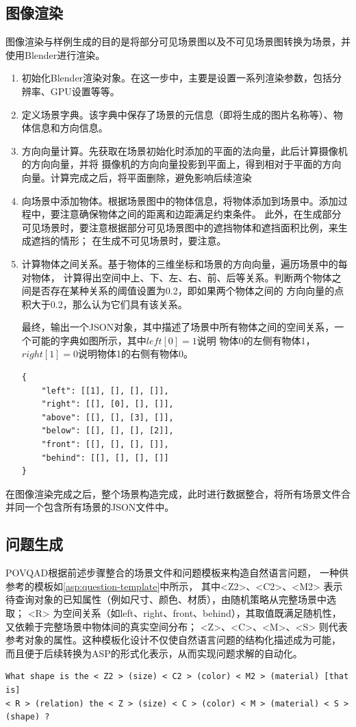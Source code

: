 \subsection{图像渲染}
图像渲染与样例生成的目的是将部分可见场景图以及不可见场景图转换为场景，并使用Blender进行渲染。

\begin{enumerate}[nosep]
\item 初始化Blender渲染对象。在这一步中，主要是设置一系列渲染参数，包括分辨率、GPU设置等等。
\item 定义场景字典。该字典中保存了场景的元信息（即将生成的图片名称等）、物体信息和方向信息。
\item 方向向量计算。先获取在场景初始化时添加的平面的法向量，此后计算摄像机的方向向量，并将
摄像机的方向向量投影到平面上，得到相对于平面的方向向量。计算完成之后，将平面删除，避免影响后续渲染
\item 向场景中添加物体。根据场景图中的物体信息，将物体添加到场景中。添加过程中，要注意确保物体之间的距离和边距满足约束条件。
此外，在生成部分可见场景时，要注意根据部分可见场景图中的遮挡物体和遮挡面积比例，来生成遮挡的情形；
在生成不可见场景时，要注意。
\item 计算物体之间关系。基于物体的三维坐标和场景的方向向量，遍历场景中的每对物体，
计算得出空间中上、下、左、右、前、后等关系。判断两个物体之间是否存在某种关系的阈值设置为0.2，即如果两个物体之间的
方向向量的点积大于0.2，那么认为它们具有该关系。

最终，输出一个JSON对象，其中描述了场景中所有物体之间的空间关系，一个可能的字典如图所示，其中$left[0] = 1$说明
物体0的左侧有物体1，$right[1] = 0$说明物体1的右侧有物体0。
\begin{lstlisting}
{
    "left": [[1], [], [], []],
    "right": [[], [0], [], []],
    "above": [[], [], [3], []],
    "below": [[], [], [], [2]],
    "front": [[], [], [], []],
    "behind": [[], [], [], []]
}
\end{lstlisting}
\end{enumerate}

在图像渲染完成之后，整个场景构造完成，此时进行数据整合，将所有场景文件合并同一个包含所有场景的JSON文件中。

\subsection{问题生成}
POVQAD根据前述步骤整合的场景文件和问题模板来构造自然语言问题，
一种供参考的模板如\ref{asp:question-template}中所示，
其中<Z2>、<C2>、<M2> 表示待查询对象的已知属性（例如尺寸、颜色、材质），由随机策略从完整场景中选取；
<R> 为空间关系（如left、right、front、behind），其取值既满足随机性，又依赖于完整场景中物体间的真实空间分布；
<Z>、<C>、<M>、<S> 则代表参考对象的属性。这种模板化设计不仅使自然语言问题的结构化描述成为可能，
而且便于后续转换为ASP的形式化表示，从而实现问题求解的自动化。
\begin{lstlisting}[label=asp:question-template]
What shape is the < Z2 > (size) < C2 > (color) < M2 > (material) [that is] 
< R > (relation) the < Z > (size) < C > (color) < M > (material) < S > (shape) ?
\end{lstlisting}

